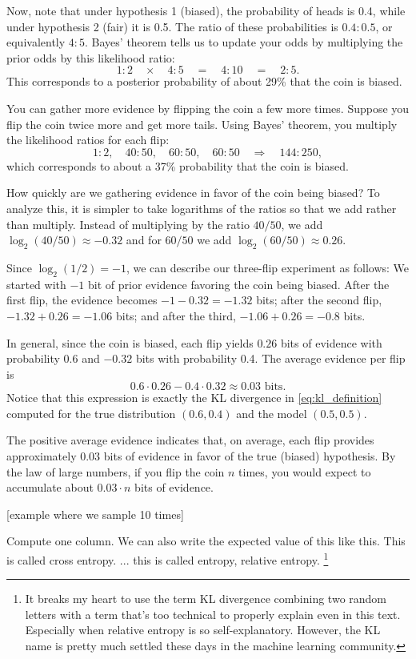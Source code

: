 \documentclass{article}
\begin{document}
Now, note that under hypothesis 1 (biased), the probability of heads is 0.4, while under hypothesis 2 (fair) it is 0.5. The ratio of these probabilities is \(0.4:0.5\), or equivalently \(4:5\). Bayes' theorem tells us to update your odds by multiplying the prior odds by this likelihood ratio:
\[
1:2 \quad \times \quad 4:5 \quad = \quad 4:10 \quad = \quad 2:5.
\]
This corresponds to a posterior probability of about 29\% that the coin is biased.

You can gather more evidence by flipping the coin a few more times. Suppose you flip the coin twice more and get more tails. Using Bayes' theorem, you multiply the likelihood ratios for each flip:
\[
1:2,\quad 40:50,\quad 60:50,\quad 60:50 \quad \Longrightarrow \quad 144:250,
\]
which corresponds to about a 37\% probability that the coin is biased.

How quickly are we gathering evidence in favor of the coin being biased? To analyze this, it is simpler to take logarithms of the ratios so that we add rather than multiply. Instead of multiplying by the ratio \(40/50\), we add \(\log_2(40/50) \approx -0.32\) and for \(60/50\) we add \(\log_2(60/50) \approx 0.26\).

Since \(\log_2(1/2) = -1\), we can describe our three-flip experiment as follows: We started with \(-1\) bit of prior evidence favoring the coin being biased. After the first flip, the evidence becomes \(-1-0.32 = -1.32\) bits; after the second flip, \(-1.32+0.26 = -1.06\) bits; and after the third, \(-1.06+0.26 = -0.8\) bits.

In general, since the coin is biased, each flip yields \(0.26\) bits of evidence with probability 0.6 and \(-0.32\) bits with probability 0.4. The average evidence per flip is
\[
0.6\cdot 0.26 - 0.4\cdot 0.32 \approx 0.03\text{ bits}.
\]
Notice that this expression is exactly the KL divergence in \cref{eq:kl_definition} computed for the true distribution \((0.6,0.4)\) and the model \((0.5,0.5)\).

The positive average evidence indicates that, on average, each flip provides approximately 0.03 bits of evidence in favor of the true (biased) hypothesis. By the law of large numbers, if you flip the coin \(n\) times, you would expect to accumulate about \(0.03\cdot n\) bits of evidence.

[example where we sample 10 times]

Compute one column. We can also write the expected value of this like this. This is called cross entropy. 
... this is called entropy, relative entropy. \footnote{It breaks my heart to use the term KL divergence combining two random letters with a term that's too technical to properly explain even in this text. Especially when relative entropy is so self-explanatory. However, the KL name is pretty much settled these days in the machine learning community. }
\end{document}
